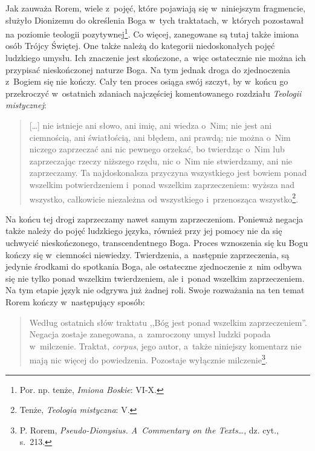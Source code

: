 Jak zauważa Rorem, wiele z~pojęć, które pojawiają się w~niniejszym fragmencie, służyło Dionizemu do określenia Boga w~tych traktatach, w~których pozostawał na poziomie teologii pozytywnej\footnote{Por. np. tenże, \textit{Imiona Boskie}: VI-X.}. Co więcej, zanegowane są tutaj także imiona osób Trójcy Świętej. One także należą do kategorii niedoskonałych pojęć ludzkiego umysłu. Ich znaczenie jest skończone, a~więc ostatecznie nie można ich przypisać nieskończonej naturze Boga. Na tym jednak droga do zjednoczenia z~Bogiem się nie kończy. Cały ten proces osiąga swój szczyt, by w~końcu go przekroczyć w~ostatnich zdaniach najczęściej komentowanego rozdziału \textit{Teologii mistycznej}:

\begin{quote}
[\ldots] nie istnieje ani słowo, ani imię, ani wiedza o~Nim; nie jest ani ciemnością, ani światłością, ani błędem, ani prawdą; nie można o~Nim niczego zaprzeczać ani nic pewnego orzekać, bo twierdząc o~Nim lub zaprzeczając rzeczy niższego rzędu, nic o~Nim nie stwierdzamy, ani nie zaprzeczamy. Ta najdoskonalsza przyczyna wszystkiego jest bowiem ponad wszelkim potwierdzeniem i~ponad wszelkim zaprzeczeniem: wyższa nad wszystko, całkowicie niezależna od wszystkiego i~przenosząca wszystko\footnote{Tenże, \textit{Teologia mistyczna}: V.}.
\end{quote}

Na końcu tej drogi zaprzeczamy nawet samym zaprzeczeniom. Ponieważ negacja także należy do pojęć ludzkiego języka, również przy jej pomocy nie da się uchwycić nieskończonego, transcendentnego Boga. Proces wznoszenia się ku Bogu kończy się w~ciemności niewiedzy. Twierdzenia, a~następnie zaprzeczenia, są jedynie środkami do spotkania Boga, ale ostateczne zjednoczenie z~nim odbywa się nie tylko ponad wszelkim twierdzeniem, ale i~ponad wszelkim zaprzeczeniem. Na tym etapie język nie odgrywa już żadnej roli. Swoje rozważania na ten temat Rorem kończy w~następujący sposób:

\begin{quote}
Według ostatnich słów traktatu ,,Bóg jest ponad wszelkim zaprzeczeniem''. Negacja zostaje zanegowana, a~zamroczony umysł ludzki popada w~milczenie. Traktat, \textit{corpus}, jego autor, a~także niniejszy komentarz nie mają nic więcej do powiedzenia. Pozostaje wyłącznie milczenie\footnote{P. Rorem, \textit{Pseudo-Dionysius. A~Commentary on the Texts}\ldots, dz. cyt., s.~213.}.
\end{quote}


